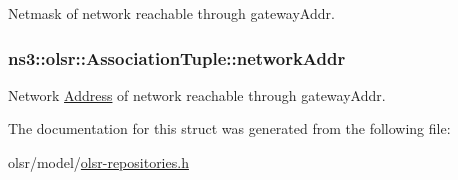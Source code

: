 Netmask of network reachable through gateway\+Addr. 

\subsubsection[{\texorpdfstring{network\+Addr}{networkAddr}}]{ ns3\+::olsr\+::\+Association\+Tuple\+::network\+Addr}\hypertarget{structns3_1_1olsr_1_1AssociationTuple_a09d79f6792b7c7943a25f2da13ae4c59}{}\label{structns3_1_1olsr_1_1AssociationTuple_a09d79f6792b7c7943a25f2da13ae4c59}


Network \hyperlink{classns3_1_1Address}{Address} of network reachable through gateway\+Addr. 



The documentation for this struct was generated from the following file\+:\begin{DoxyCompactItemize}
\item 
olsr/model/\hyperlink{olsr-repositories_8h}{olsr-\/repositories.\+h}\end{DoxyCompactItemize}
